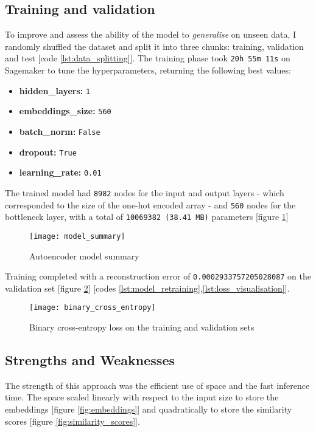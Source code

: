 \subsection{Training and validation}

To improve and assess the ability of the model to \textit{generalise} on unseen data, I randomly shuffled the dataset and split
it into three chunks: training, validation and test [code \ref{lst:data_splitting}].
The training phase took \verb|20h 55m 11s| on Sagemaker to tune the hyperparameters,
returning the following best values:

\begin{itemize}
  \item \textbf{hidden\_layers:} \verb|1|
  \item \textbf{embeddings\_size:} \verb|560|
  \item \textbf{batch\_norm:} \verb|False|
  \item \textbf{dropout:} \verb|True|
  \item \textbf{learning\_rate:} \verb|0.01|
\end{itemize}

The trained model had \verb|8982| nodes for the input and output layers - which corresponded to the size of
the one-hot encoded array - and \verb|560| nodes for the bottleneck layer, with a total of \verb|10069382 (38.41 MB)|
parameters [figure \ref{fig:model_summary}]

\begin{figure}[H]
  \centering
  \texttt{[image: model\_summary]}
  \caption{Autoencoder model summary}
  \label{fig:model_summary}
\end{figure}

Training completed with a reconstruction error of \verb|0.0002933757205028087| on the validation set
[figure \ref{fig:binary_cross_entropy}] [codes \ref{lst:model_retraining},\ref{lst:loss_visualisation}].

\begin{figure}[H]
  \centering
  \texttt{[image: binary\_cross\_entropy]}
  \caption{Binary cross-entropy loss on the training and validation sets}
  \label{fig:binary_cross_entropy}
\end{figure}

\subsection{Strengths and Weaknesses}

The strength of this approach was the efficient use of space and the fast inference time.
The space scaled linearly with respect to the input size to store the embeddings [figure \ref{fig:embeddings}]
and quadratically to store the similarity scores [figure \ref{fig:similarity_scores}].

